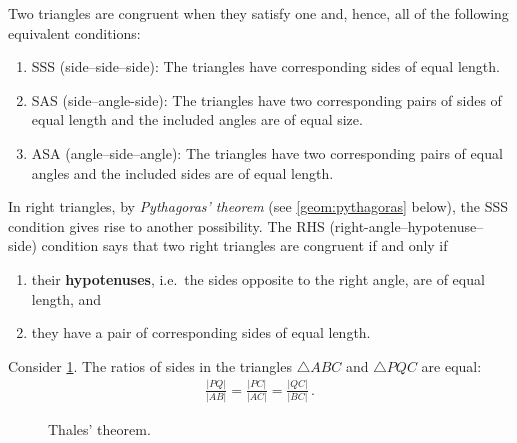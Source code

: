     \begin{method}
        Two triangles are congruent when they satisfy one and, hence, all of the following equivalent conditions:
        \begin{enumerate}[\quad a)]
            \item SSS (side--side--side): The triangles have corresponding sides of equal length.
            \item SAS (side--angle-side): The triangles have two corresponding pairs of sides of equal length and the included angles are of equal size.
            \item ASA (angle--side--angle): The triangles have two corresponding pairs of equal angles and the included sides are of equal length.
        \end{enumerate}
    \end{method}
    \begin{result}
        In right triangles, by \textit{Pythagoras' theorem} (see \cref{geom:pythagoras} below), the SSS condition gives rise to another possibility. The RHS (right-angle--hypotenuse--side) condition says that two right triangles are congruent if and only if
        \begin{enumerate}
            \item their \textbf{hypotenuses}, i.e.~the sides opposite to the right angle, are of equal length, and
            \item they have a pair of corresponding sides of equal length.
        \end{enumerate}
    \end{result}

    \begin{theorem}[Thales]
        Consider \cref{fig:thales}. The ratios of sides in the triangles $\bigtriangleup ABC$ and $\bigtriangleup PQC$ are equal:
        \begin{gather}
            \frac{|PQ|}{|AB|} = \frac{|PC|}{|AC|} = \frac{|QC|}{|BC|}\,.
        \end{gather}
    \end{theorem}

    \begin{figure}
        \centering
        \caption{Thales' theorem.}
        \label{fig:thales}
    \end{figure}

